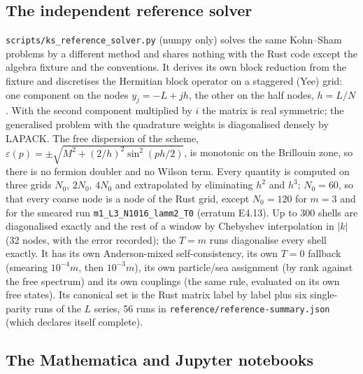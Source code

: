 \documentclass[11pt]{article}
\begin{document}
\subsection{The independent reference solver}

\texttt{scripts/\allowbreak{}ks\_refer\allowbreak{}ence\_sol\allowbreak{}ver.py} (numpy only) solves the same Kohn--Sham problems by a different method and shares nothing with the Rust code except the algebra fixture and the conventions. It derives its own block reduction from the fixture and discretises the Hermitian block operator on a staggered (Yee) grid: one component on the nodes $y_j=-L+jh$, the other on the half nodes, $h=L/N$. With the second component multiplied by $i$ the matrix is real symmetric; the generalised problem with the quadrature weights is diagonalised densely by LAPACK. The free dispersion of the scheme, $\varepsilon(p)=\pm\sqrt{M^2+(2/h)^2\sin^2(ph/2)}$, is monotonic on the Brillouin zone, so there is no fermion doubler and no Wilson term. Every quantity is computed on three grids $N_0$, $2N_0$, $4N_0$ and extrapolated by eliminating $h^2$ and $h^3$; $N_0=60$, so that every coarse node is a node of the Rust grid, except $N_0=120$ for $m=3$ and for the smeared run \texttt{m1\_L3\_N1\allowbreak{}016\_lamm\allowbreak{}2\_T0} (erratum E4.13). Up to 300 shells are diagonalised exactly and the rest of a window by Chebyshev interpolation in $|k|$ (32 nodes, with the error recorded); the $T=m$ runs diagonalise every shell exactly. It has its own Anderson-mixed self-consistency, its own $T=0$ fallback (smearing $10^{-4}m$, then $10^{-3}m$), its own particle/sea assignment (by rank against the free spectrum) and its own couplings (the same rule, evaluated on its own free states). Its canonical set is the Rust matrix label by label plus six single-parity runs of the $L$ series, 56 runs in \texttt{referenc\allowbreak{}e/refere\allowbreak{}nce-summ\allowbreak{}ary.json} (which declares itself complete).

\subsection{The Mathematica and Jupyter notebooks}
\end{document}
